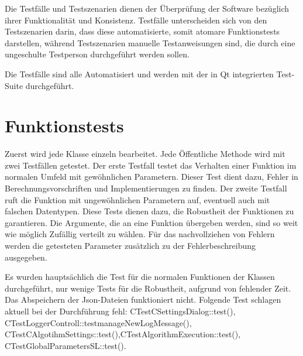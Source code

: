 Die Testfälle und Testszenarien dienen der Überprüfung der Software bezüglich ihrer Funktionalität und Konsistenz. Testfälle unterscheiden sich von den Testszenarien darin, dass diese automatisierte, somit atomare Funktionstests darstellen, während Testszenarien manuelle Testanweisungen sind, die durch eine ungeschulte Testperson durchgeführt werden sollen.

Die Testfälle sind alle Automatisiert und werden mit der in Qt integrierten Test-Suite durchgeführt.
\section{Funktionstests}
Zuerst wird jede Klasse einzeln bearbeitet. Jede Öffentliche Methode wird mit zwei Testfällen getestet. Der erste Testfall testet das Verhalten einer Funktion im normalen Umfeld mit gewöhnlichen Parametern. Dieser Test dient dazu, Fehler in Berechnungsvorschriften und Implementierungen zu finden. Der zweite Testfall ruft die Funktion mit ungewöhnlichen Parametern auf, eventuell auch mit falschen Datentypen. Diese Tests dienen dazu, die Robustheit der Funktionen zu garantieren. Die Argumente, die an eine Funktion übergeben werden, sind so weit wie möglich Zufällig verteilt zu wählen. Für das nachvollziehen von Fehlern werden die getesteten Parameter zusätzlich zu der Fehlerbeschreibung ausgegeben.

Es wurden hauptsächlich die Test für die normalen Funktionen der Klassen durchgeführt, nur wenige Tests für die Robustheit, aufgrund von fehlender Zeit. Das Abspeichern der Json-Dateien funktioniert nicht.
Folgende Test schlagen aktuell bei der Durchführung fehl: CTestCSettingsDialog::test(), CTestLoggerControll::testmanageNewLogMessage(), CTestCAlgotihmSettings::test(),CTestAlgorithmExecution::test(), CTestGlobalParametersSL::test().


